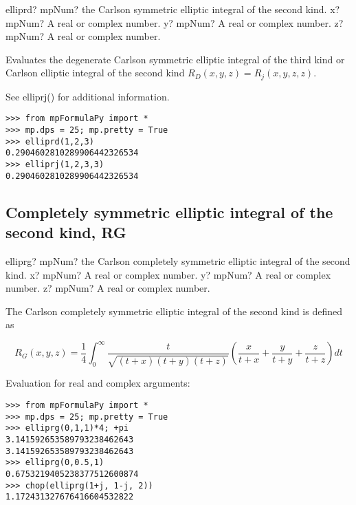 \begin{mpFunctionsExtract}
	\mpFunctionThree
	{elliprd? mpNum? the Carlson symmetric elliptic integral of the second kind.}
	{x? mpNum? A real or complex number.}	
	{y? mpNum? A real or complex number.}
	{z? mpNum? A real or complex number.}	
\end{mpFunctionsExtract}


\vpara
Evaluates the degenerate Carlson symmetric elliptic integral of the third kind or Carlson elliptic integral of the second kind $R_D(x,y,z) = R_j(x,y,z,z)$.

See elliprj() for additional information.



\begin{lstlisting}
>>> from mpFormulaPy import *
>>> mp.dps = 25; mp.pretty = True
>>> elliprd(1,2,3)
0.2904602810289906442326534
>>> elliprj(1,2,3,3)
0.2904602810289906442326534
\end{lstlisting}



\subsection{Completely symmetric elliptic integral of the second kind, RG}

\begin{mpFunctionsExtract}
	\mpFunctionThree
	{elliprg? mpNum? the Carlson completely symmetric elliptic integral of the second kind.}
	{x? mpNum? A real or complex number.}	
	{y? mpNum? A real or complex number.}
	{z? mpNum? A real or complex number.}	
\end{mpFunctionsExtract}

\vpara
The Carlson completely symmetric elliptic integral of the second kind is defined as

\begin{equation}
R_G(x,y,z) = \frac{1}{4} \int_0^{\infty} \frac{t}{\sqrt{(t+x)(t+y)(t+z)}} \left( \frac{x}{t+x} +  \frac{y}{t+y} +  \frac{z}{t+z}  \right) dt
\end{equation}

Evaluation for real and complex arguments:

\begin{lstlisting}
>>> from mpFormulaPy import *
>>> mp.dps = 25; mp.pretty = True
>>> elliprg(0,1,1)*4; +pi
3.141592653589793238462643
3.141592653589793238462643
>>> elliprg(0,0.5,1)
0.6753219405238377512600874
>>> chop(elliprg(1+j, 1-j, 2))
1.172431327676416604532822
\end{lstlisting}




